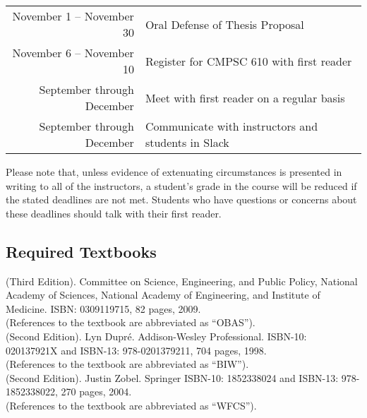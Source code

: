 \documentclass[11pt]{article}
\begin{document}
\begin{center}
\begin{longtable}{r|l}
\hline

November 1 -- November 30 & Oral Defense of Thesis Proposal          \\
November 6 -- November 10 & Register for CMPSC 610 with first reader \\

\hline

September through December & Meet with first reader on a regular basis          \\
September through December & Communicate with instructors and students in Slack \\

\hline

\end{longtable}
\end{center}

\vspace*{-.25in}

\noindent Please note that, unless evidence of extenuating circumstances is
presented in writing to all of the instructors, a student's grade in the course
will be reduced if the stated deadlines are not met. Students who have questions
or concerns about these deadlines should talk with their first reader.

\subsection*{Required Textbooks}

(Third Edition).  Committee on Science, Engineering, and Public Policy, National
Academy of Sciences, National Academy of Engineering, and Institute of Medicine.
ISBN: 0309119715, 82 pages, 2009.\\ (References to the textbook are abbreviated
as ``OBAS''). \\

 (Second
Edition). Lyn Dupr\'e.  Addison-Wesley Professional.  ISBN-10: 020137921X and
ISBN-13: 978-0201379211, 704 pages, 1998.\\ (References to the textbook are
abbreviated as ``BIW''). \\

 (Second Edition).  Justin Zobel.
Springer ISBN-10: 1852338024 and ISBN-13: 978-1852338022, 270 pages, 2004. \\
(References to the textbook are abbreviated as ``WFCS''). \\
\end{document}
